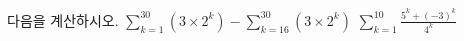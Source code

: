 다음을 계산하시오.
 $\displaystyle\sum_{k=1}^{30}(3\times2^k)-\sum_{k=16}^{30}(3\times2^k)$
 $\displaystyle\sum_{k=1}^{10}\frac{5^k+(-3)^k}{4^k}$
